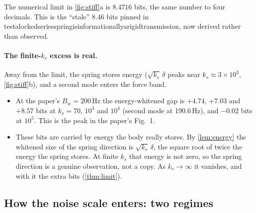 \documentclass[11pt]{article}
\theoremstyle{definition}
\theoremstyle{remark}
\newcommand{\codeus}{\textunderscore\allowbreak}
\newcommand{\code}[1]{{\ttfamily\let\_\codeus\hyphenchar\font=-1 #1}}
\begin{document}
The numerical limit in \cref{fig:stiff}a is $8.4716$ bits, the same number to four
decimals. This is the ``stale'' 8.46 bits pinned in
\code{test\_a\_locked\_series\_spring\_is\_informationally\_a\_rigid\_transmission}, now
derived rather than observed.

\paragraph{The finite-$k_s$ excess is real.} Away from the limit, the spring stores energy
($\sqrt{k_s}\,\delta$ peaks near $k_s\approx3\times10^3$, \cref{fig:stiff}b), and a second
mode enters the force band.
\begin{itemize}[nosep]
  \item At the paper's $B_w=200$\,Hz the energy-whitened gap is $+4.74$, $+7.03$ and
        $+8.57$ bits at $k_s=70$, $10^3$ and $10^4$ (second mode at 190.6\,Hz), and
        $-0.02$ bits at $10^5$. This is the peak in the paper's Fig.~1.
  \item These bits are carried by energy the body really stores. By \cref{lem:energy}
        the whitened size of the spring direction is $\sqrt{k_s}\,\delta$, the square
        root of twice the energy the spring stores. At finite $k_s$ that energy is not
        zero, so the spring direction is a genuine observation, not a copy. As
        $k_s\to\infty$ it vanishes, and with it the extra bits (\cref{thm:limit}).
\end{itemize}

\subsection{How the noise scale enters: two regimes}
\end{document}
